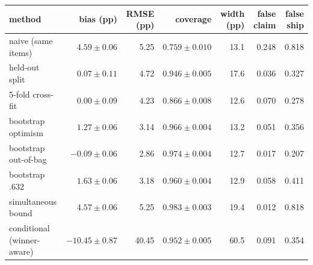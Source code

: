 {\footnotesize\setlength{\tabcolsep}{3.5pt}
\begin{tabular}{lrrrrrr}
\toprule
method & bias (pp) & RMSE (pp) & coverage & width (pp) & false claim & false ship \\
\midrule
naive (same items) & $4.59 \pm 0.06$ & 5.25 & $0.759 \pm 0.010$ & 13.1 & 0.248 & 0.818 \\
held-out split & $0.07 \pm 0.11$ & 4.72 & $0.946 \pm 0.005$ & 17.6 & 0.036 & 0.327 \\
5-fold cross-fit & $0.00 \pm 0.09$ & 4.23 & $0.866 \pm 0.008$ & 12.6 & 0.070 & 0.278 \\
bootstrap optimism & $1.27 \pm 0.06$ & 3.14 & $0.966 \pm 0.004$ & 13.2 & 0.051 & 0.356 \\
bootstrap out-of-bag & $-0.09 \pm 0.06$ & 2.86 & $0.974 \pm 0.004$ & 12.7 & 0.017 & 0.207 \\
bootstrap .632 & $1.63 \pm 0.06$ & 3.18 & $0.960 \pm 0.004$ & 12.9 & 0.058 & 0.411 \\
simultaneous bound & $4.57 \pm 0.06$ & 5.25 & $0.983 \pm 0.003$ & 19.4 & 0.012 & 0.818 \\
conditional (winner-aware) & $-10.45 \pm 0.87$ & 40.45 & $0.952 \pm 0.005$ & 60.5 & 0.091 & 0.354 \\
\bottomrule
\end{tabular}}
